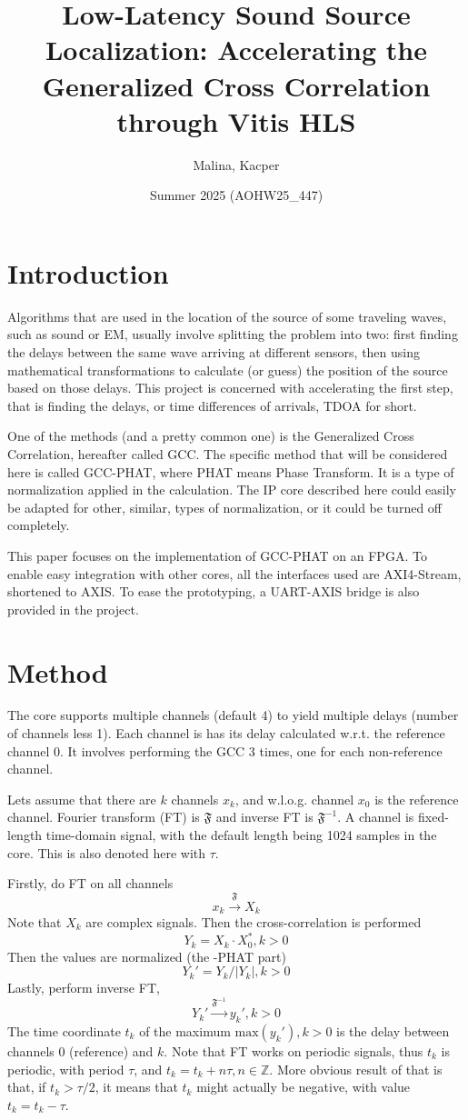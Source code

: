 \documentclass[a4paper,twocolumn]{article}
\title{Low-Latency Sound Source Localization: Accelerating the Generalized Cross Correlation through Vitis HLS}
\date{Summer 2025 (AOHW25\_447)}
\author{
  Malina, Kacper
}
\begin{document}
\maketitle

\section{Introduction}

Algorithms that are used in the location of the source of
some traveling waves, such as sound or EM, usually involve splitting
the problem into two: first finding the delays between the same wave
arriving at different sensors, then using mathematical transformations
to calculate (or guess) the position of the source based on those
delays\cite{tdoamlat}. This project is concerned with accelerating the
first step, that is finding the delays, or time differences of
arrivals, TDOA for short.

One of the methods (and a pretty common one) is the Generalized Cross
Correlation, hereafter called GCC\cite{gccphat}. The specific method
that will be considered here is called GCC-PHAT, where PHAT means
Phase Transform. It is a type of normalization applied in the
calculation. The IP core described here could easily be adapted for
other, similar, types of normalization, or it could be turned off
completely.

This paper focuses on the implementation of GCC-PHAT on an FPGA. To
enable easy integration with other cores, all the interfaces used are
AXI4-Stream\cite{axis}, shortened to AXIS. To ease the prototyping, a
UART-AXIS bridge is also provided in the project.

\section{Method}

The core supports multiple channels (default 4) to yield multiple
delays (number of channels less 1). Each channel is has its delay
calculated w.r.t. the reference channel 0. It involves performing the
GCC 3 times, one for each non-reference channel.

Lets assume that there are $k$ channels $x_k$, and w.l.o.g. channel
$x_0$ is the reference channel. Fourier transform (FT) is
$\mathfrak F$ and inverse FT is $\mathfrak F^{-1}$. A channel is
fixed-length time-domain signal, with the default length being
1024 samples in the core. This is also denoted here with $\tau$.

Firstly, do FT on all channels
\[x_k \xrightarrow{\mathfrak F} X_k\]
Note that $X_k$ are complex signals.
Then the cross-correlation is performed
\[Y_k = X_k \cdot X_0^*, k > 0\]
Then the values are normalized (the -PHAT part)
\[Y_k' = Y_k / |Y_k|, k > 0\]
Lastly, perform inverse FT,
\[Y_k' \xrightarrow{\mathfrak F^{-1}} y_k', k > 0\]
The time coordinate $t_k$ of the maximum $\mathrm{max}(y_k'), k > 0$
is the delay between channels 0 (reference) and $k$.
Note that FT works on periodic signals, thus $t_k$ is periodic, with
period $\tau$, and $t_k = t_k + n\tau, n\in\mathbb{Z}$. More obvious
result of that is that, if $t_k > \tau / 2$, it means that $t_k$ might
actually be negative, with value $t_k = t_k - \tau$.
\end{document}
